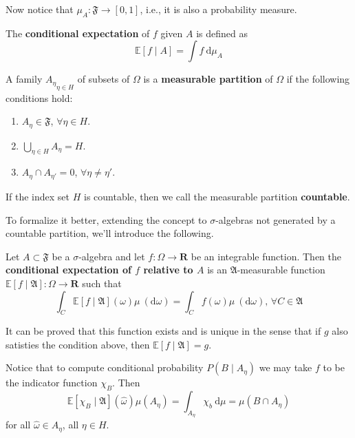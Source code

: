 Now notice that $\mu_A : \mathfrak{F} \longrightarrow [0,1]$, i.e., it is also a probability measure.

\begin{definition}
	The \textbf{conditional expectation} of $f$ given $A$ is defined as 
\[
	\mathbb{E} [f \mid A] = \int f ~\mathrm{d}\mu_A
\]
\end{definition}

\begin{definition}
	A family ${A_\eta}_{\eta \in H}$ of subsets of $\Omega$ is a \textbf{measurable partition} of $\Omega$ if the following conditions hold:
	\begin{enumerate}
		\item $A_\eta \in \mathfrak{F}$, $\forall \eta \in H$.
		\item $\bigcup_{\eta \in H} A_\eta = H$.
		\item $A_\eta \cap A_{\eta'} = 0$, $\forall \eta \neq \eta'$.
	\end{enumerate}
	If the index set $H$ is countable, then we call the measurable partition \textbf{countable}.
\end{definition}

To formalize it better, extending the concept to $\sigma$-algebras not generated by a countable partition, we'll introduce the following.

\begin{definition}
	Let $A \subset \mathfrak{F}$ be a $\sigma$-algebra and let $f : \Omega \longrightarrow \textbf{R}$ be an integrable function. Then the \textbf{conditional expectation of $f$ relative to $A$} is an $\mathfrak{A}$-measurable function $\mathbb{E}[f \mid \mathfrak{A}] : \Omega \longrightarrow \textbf{R}$ such that
	\[
		\int_C \mathbb{E}[f \mid \mathfrak{A}](\omega) \mu ~(\mathrm{d} \omega) = \int_C f(\omega) \mu ~(\mathrm{d} \omega), \, \forall C \in \mathfrak{A}
	\]
\end{definition}

It can be proved that this function exists and is unique in the sense that if $g$ also satisties the condition above, then $\mathbb{E}[f \mid \mathfrak{A}] = g$.

Notice that to compute conditional probability $P(B \mid A_\eta)$ we may take $f$ to be the indicator function $\chi_B$. Then
\[
	\mathbb{E}[\chi_B \mid \mathfrak{A}](\hat{\omega}) \mu(A_\eta) = \int_{A_\eta} \chi_b ~\mathrm{d}\mu = \mu(B \cap A_\eta)
\]
for all $\hat{\omega} \in A_\eta$, all $\eta \in H$.

